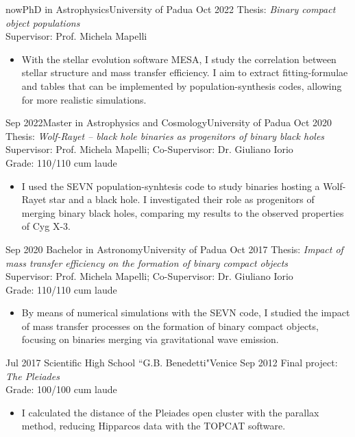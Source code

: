 %
%
%
\begin{experiences}
  \experience
    {now}{PhD in Astrophysics}{University of Padua}
    {Oct 2022}
    {Thesis: \textit{Binary compact object populations} \\
    Supervisor: Prof. Michela Mapelli  }{
    \begin{itemize}
        \item  With the stellar evolution software MESA, I study the correlation between stellar structure and mass transfer efficiency. I aim to extract fitting-formulae and tables that can be implemented by population-synthesis codes, allowing for more realistic simulations.
    \end{itemize}
   }
  \emptySeparator
  \experience
    {Sep 2022}{Master in Astrophysics and Cosmology}{University of Padua}
    {Oct 2020} 
    {Thesis: \textit{Wolf-Rayet -- black hole binaries as progenitors of binary black holes} \\
    Supervisor: Prof. Michela Mapelli; Co-Supervisor: Dr. Giuliano Iorio \\
    Grade: 110/110 cum laude}{
    \begin{itemize}
        \item I used the SEVN population-synhtesis code to study binaries hosting a Wolf-Rayet star and a black hole. I investigated their role as progenitors of merging binary black holes, comparing my results to the observed properties of Cyg X-3. 
    \end{itemize}
    }
  \emptySeparator
  \experience
    {Sep 2020}   {Bachelor in Astronomy}{University of Padua}
    {Oct 2017} 
    {Thesis: \textit{Impact of mass transfer efficiency on the formation of binary compact objects} \\
    Supervisor: Prof. Michela Mapelli; Co-Supervisor: Dr. Giuliano Iorio \\
    Grade: 110/110 cum laude  }{
    \begin{itemize}
        \item  By means of numerical simulations with the SEVN code, I studied the impact of mass transfer processes on the formation of binary compact objects, focusing on binaries merging via gravitational wave emission.
    \end{itemize}
   }
  \emptySeparator
    \experience
    {Jul 2017}   {Scientific High School ``G.B. Benedetti"}{Venice}
    {Sep 2012} 
    {Final project: \textit{The Pleiades} \\
    Grade: 100/100 cum laude }{    
    \begin{itemize}
        \item I calculated the distance of the Pleiades open cluster with the parallax method, reducing Hipparcos data with the TOPCAT software.
    \end{itemize}
    } 
\end{experiences}
